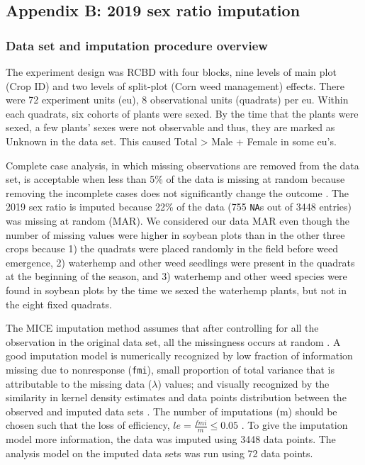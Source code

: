 \documentclass[
]{article}
\begin{document}
\hypertarget{appendix-b-2019-sex-ratio-imputation}{%
\subsection*{Appendix B: 2019 sex ratio imputation}\label{appendix-b-2019-sex-ratio-imputation}}

\hypertarget{data-set-and-imputation-procedure-overview}{%
\subsubsection*{Data set and imputation procedure overview}\label{data-set-and-imputation-procedure-overview}}

The experiment design was RCBD with four blocks, nine levels of main plot (Crop ID) and two levels of split-plot (Corn weed management) effects. There were 72 experiment units (eu), 8 observational units (quadrats) per eu. Within each quadrats, six cohorts of plants were sexed. By the time that the plants were sexed, a few plants' sexes were not observable and thus, they are marked as Unknown in the data set. This caused Total \textgreater{} Male + Female in some eu's.

Complete case analysis, in which missing observations are removed from the data set, is acceptable when less than 5\% of the data is missing at random because removing the incomplete cases does not significantly change the outcome \citep{azurMultipleImputationChained2011}. The 2019 sex ratio is imputed because 22\% of the data (755 \texttt{NA}s out of 3448 entries) was missing at random (MAR). We considered our data MAR even though the number of missing values were higher in soybean plots than in the other three crops because 1) the quadrats were placed randomly in the field before weed emergence, 2) waterhemp and other weed seedlings were present in the quadrats at the beginning of the season, and 3) waterhemp and other weed species were found in soybean plots by the time we sexed the waterhemp plants, but not in the eight fixed quadrats.

The MICE imputation method assumes that after controlling for all the observation in the original data set, all the missingness occurs at random \citep{vanbuurenMiceMultivariateImputation2011}. A good imputation model is numerically recognized by low fraction of information missing due to nonresponse (\texttt{fmi}), small proportion of total variance that is attributable to the missing data (\(\lambda\)) values; and visually recognized by the similarity in kernel density estimates and data points distribution between the observed and imputed data sets \citep{vanbuurenMiceMultivariateImputation2011}. The number of imputations (m) should be chosen such that the loss of efficiency, \(le = \frac{fmi}{m} \leq 0.05\) \citep{whiteMultipleImputationUsing2011}. To give the imputation model more information, the data was imputed using 3448 data points. The analysis model on the imputed data sets was run using 72 data points.
\end{document}
